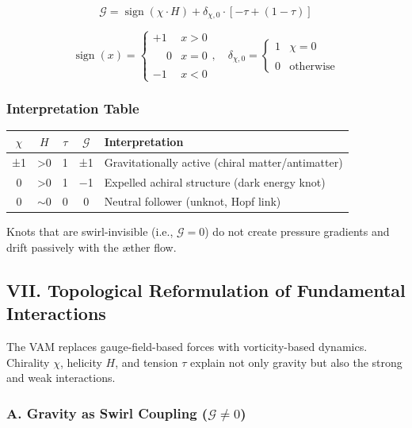 \documentclass[12pt]{article}
\begin{document}
\[
\boxed{
\mathcal{G} = \operatorname{sign}(\chi \cdot H)
+ \delta_{\chi, 0} \cdot \left[ -\tau + (1 - \tau) \right]
}
\]

\[
\operatorname{sign}(x) =
\begin{cases}
+1 & x > 0 \\\\
\phantom{+}0 & x = 0 \\\\
-1 & x < 0
\end{cases},
\quad
\delta_{\chi, 0} =
\begin{cases}
1 & \chi = 0 \\\\
0 & \text{otherwise}
\end{cases}
\]

\subsubsection*{Interpretation Table}

\begin{center}
\begin{tabular}{|c|c|c|c|l|}
\hline
$\chi$ & $H$ & $\tau$ & $\mathcal{G}$ & Interpretation \\\hline
±1 & >0 & 1 & ±1 & Gravitationally active (chiral matter/antimatter) \\\hline
0 & >0 & 1 & −1 & Expelled achiral structure (dark energy knot) \\\hline
0 & $\sim$0 & 0 & 0 & Neutral follower (unknot, Hopf link) \\\hline
\end{tabular}
\end{center}

Knots that are swirl-invisible (i.e., $\mathcal{G} = 0$) do not create pressure gradients and drift passively with the æther flow.

\subsection*{VII. Topological Reformulation of Fundamental Interactions}

The VAM replaces gauge-field-based forces with vorticity-based dynamics. Chirality $\chi$, helicity $H$, and tension $\tau$ explain not only gravity but also the strong and weak interactions.

\subsubsection*{A. Gravity as Swirl Coupling ($\mathcal{G} \ne 0$)}
\end{document}
